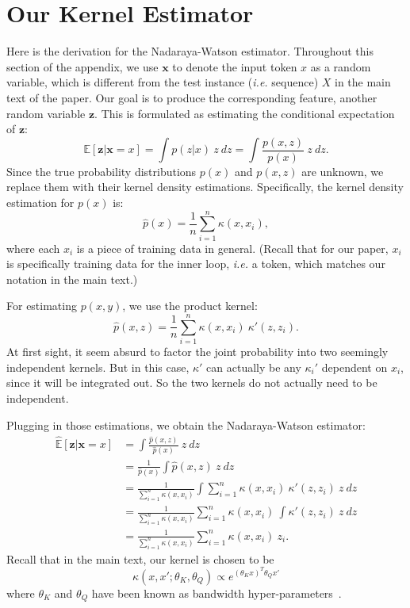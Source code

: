 \documentclass{article}
\newcommand{\E}{\mathbb{E}}
\begin{document}
\section{Our Kernel Estimator}
\label{app:nwk}
Here is the derivation for the Nadaraya-Watson estimator.
Throughout this section of the appendix, we use $\mathbf{x}$ to denote the input token $x$ as a random variable, which is different from the test instance (\textit{i.e.} sequence) $X$ in the main text of the paper.
Our goal is to produce the corresponding feature, another random variable $\mathbf{z}$.
This is formulated as estimating the conditional expectation of $\mathbf{z}$:
$$
\E[\mathbf{z}|\mathbf{x} = x] = \int p(z|x)~z~dz = \int \frac{p(x, z)}{p(x)}~z~dz.
$$
Since the true probability distributions $p(x)$ and $p(x, z)$ are unknown, we replace them with their kernel density estimations.
Specifically, the kernel density estimation for $p(x)$ is:
$$
\hat{p}(x) = \frac{1}{n}\sum_{i=1}^n \kappa(x, x_i),
$$
where each $x_i$ is a piece of training data in general.
(Recall that for our paper, $x_i$ is specifically training data for the inner loop, \textit{i.e.} a token, which matches our notation in the main text.)

For estimating $p(x,y)$, we use the product kernel:
$$
\hat{p}(x, z) = \frac{1}{n}\sum_{i=1}^n \kappa(x, x_i)~\kappa'(z, z_i).
$$
At first sight, it seem absurd to factor the joint probability into two seemingly independent kernels.
But in this case, $\kappa'$ can actually be any $\kappa_i'$ dependent on $x_i$, since it will be integrated out. So the two kernels do not actually need to be independent.

Plugging in those estimations, we obtain the Nadaraya-Watson estimator:
\begin{align*}
\hat{\E}[\mathbf{z}|\mathbf{x} = x] &= \int \frac{\hat{p}(x, z)}{\hat{p}(x)}~z~dz \\
&= \frac{1}{\hat{p}(x)} \int \hat{p}(x, z)~z~dz \\
&= \frac{1}{\sum_{i=1}^n \kappa(x, x_i)} \int \sum_{i=1}^n \kappa(x, x_i)~\kappa'(z, z_i)~z~dz \\
&= \frac{1}{\sum_{i=1}^n \kappa(x, x_i)} \sum_{i=1}^n \kappa(x, x_i)~\int \kappa'(z, z_i)~z~dz \\
&= \frac{1}{\sum_{i=1}^n \kappa(x, x_i)} \sum_{i=1}^n \kappa(x, x_i) ~z_i.
\end{align*}
Recall that in the main text, our kernel is chosen to be
\begin{equation}
\kappa(x, x'; \theta_K, \theta_Q) \propto e^{(\theta_Kx)^T \theta_Qx'}
\end{equation}
where $\theta_K$ and $\theta_Q$ have been known as bandwidth hyper-parameters~\citep{williams2006gaussian}.
\end{document}
